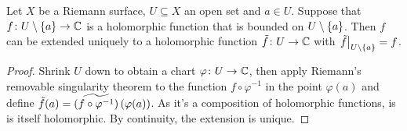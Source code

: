 \begin{izrek}
Let $X$ be a Riemann surface, $U \subseteq X$ an open set and
$a \in U$. Suppose that $f \colon U \setminus \left\{a\right\} \to \mathbb{C}$ is a
holomorphic function that is bounded on $U \setminus \left\{a\right\}$. Then
$f$ can be extended uniquely to a holomorphic function
$\tilde{f} \colon U \to \mathbb{C}$ with
$\left. \tilde{f}\right|_{U \setminus \left\{a\right\}}^{} = f$.
\end{izrek}

\begin{proof}
Shrink $U$ down to obtain a chart $\varphi \colon U \to \mathbb{C}$, then
apply Riemann's removable singularity theorem to the function
$f \circ \varphi^{-1}$ in the point $\varphi(a)$ and define
$\tilde{f}(a) =
\widetilde{\left(f \circ \varphi^{-1}\right)} \left(\varphi(a)\right)$.
As it's a composition of holomorphic functions, is is itself
holomorphic. By continuity, the extension is unique.
\end{proof}
